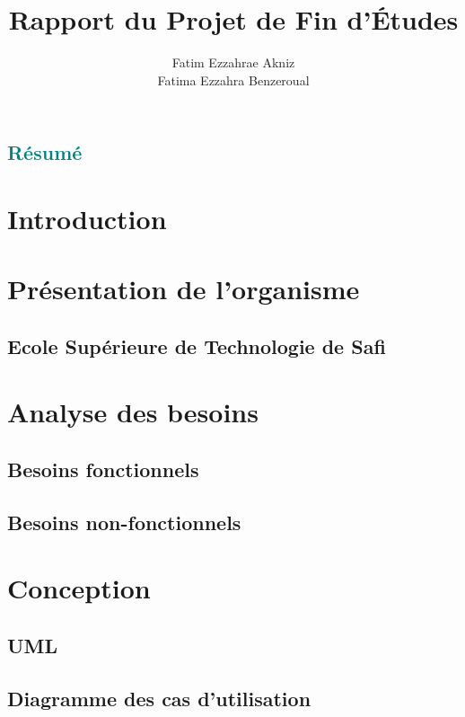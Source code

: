 \documentclass{report}
\title{Rapport du Projet de Fin d'Études}
\author{Fatim Ezzahrae Akniz \\ Fatima Ezzahra Benzeroual}
\begin{document}
\maketitle

\section*{\textcolor{teal}{Résumé}}  %

{ %
\titleformat{\chapter}{\normalfont\Huge}{}{0pt}{}  %
\tableofcontents
\listoffigures  %
} %
\clearpage

\chapter{Introduction}

\chapter{Présentation de l'organisme}
\section{Ecole Supérieure de Technologie de Safi}

\chapter{Analyse des besoins}
\section{Besoins fonctionnels}
\section{Besoins non-fonctionnels}

\chapter{Conception}
\section{UML}
\section{Diagramme des cas d'utilisation}
\end{document}
